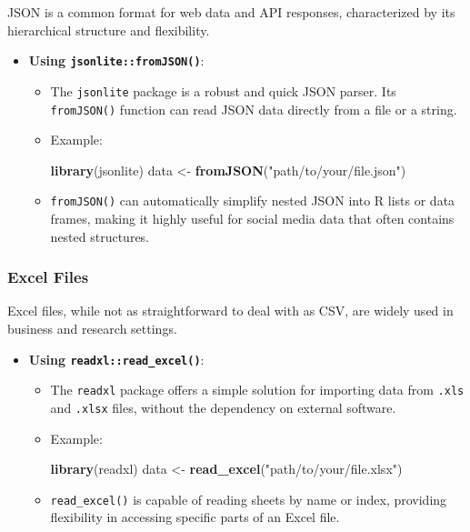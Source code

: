 \documentclass[
]{book}
\newenvironment{Shaded}{\begin{snugshade}}{\end{snugshade}}
\newcommand{\FunctionTok}[1]{\textcolor[rgb]{0.13,0.29,0.53}{\textbf{#1}}}
\newcommand{\NormalTok}[1]{#1}
\newcommand{\OtherTok}[1]{\textcolor[rgb]{0.56,0.35,0.01}{#1}}
\newcommand{\StringTok}[1]{\textcolor[rgb]{0.31,0.60,0.02}{#1}}
\providecommand{\tightlist}{%
  \setlength{\itemsep}{0pt}\setlength{\parskip}{0pt}}
\begin{document}
JSON is a common format for web data and API responses, characterized by its hierarchical structure and flexibility.

\begin{itemize}
\tightlist
\item
  \textbf{Using \texttt{jsonlite::fromJSON()}}:

  \begin{itemize}
  \item
    The \texttt{jsonlite} package is a robust and quick JSON parser. Its \texttt{fromJSON()} function can read JSON data directly from a file or a string.
  \item
    Example:

\begin{Shaded}
\begin{Highlighting}[]
\FunctionTok{library}\NormalTok{(jsonlite)}
\NormalTok{data }\OtherTok{\textless{}{-}} \FunctionTok{fromJSON}\NormalTok{(}\StringTok{"path/to/your/file.json"}\NormalTok{)}
\end{Highlighting}
\end{Shaded}
  \item
    \texttt{fromJSON()} can automatically simplify nested JSON into R lists or data frames, making it highly useful for social media data that often contains nested structures.
  \end{itemize}
\end{itemize}

\hypertarget{excel-files}{%
\subsubsection{Excel Files}\label{excel-files}}

Excel files, while not as straightforward to deal with as CSV, are widely used in business and research settings.

\begin{itemize}
\tightlist
\item
  \textbf{Using \texttt{readxl::read\_excel()}}:

  \begin{itemize}
  \item
    The \texttt{readxl} package offers a simple solution for importing data from \texttt{.xls} and \texttt{.xlsx} files, without the dependency on external software.
  \item
    Example:

\begin{Shaded}
\begin{Highlighting}[]
\FunctionTok{library}\NormalTok{(readxl)}
\NormalTok{data }\OtherTok{\textless{}{-}} \FunctionTok{read\_excel}\NormalTok{(}\StringTok{"path/to/your/file.xlsx"}\NormalTok{)}
\end{Highlighting}
\end{Shaded}
  \item
    \texttt{read\_excel()} is capable of reading sheets by name or index, providing flexibility in accessing specific parts of an Excel file.
  \end{itemize}
\end{itemize}
\end{document}
